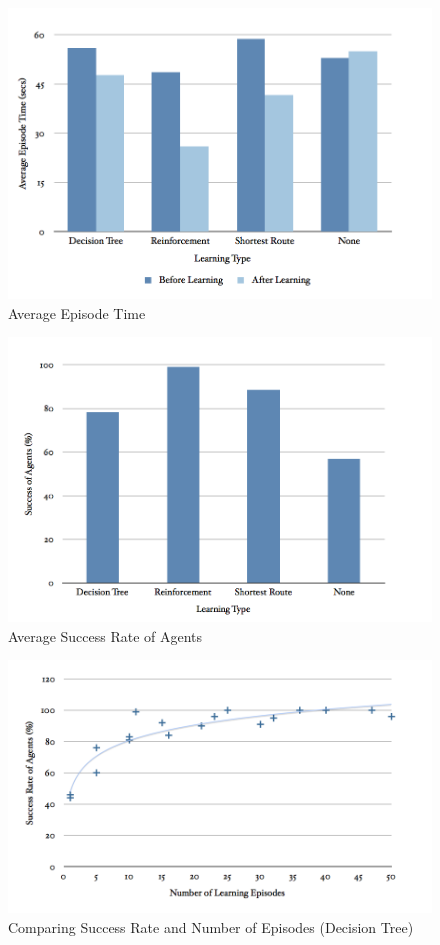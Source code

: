 \documentclass[a4paper,oneside]{report}
\begin{document}
\begin{figure}[H]
  \centering
    \includegraphics[width=130mm]{sources/images/AvgEpisode}
    \caption{Average Episode Time}
    \label{fig:AvgTime}
\end{figure}

\begin{figure}[H]
  \centering
    \includegraphics[width=130mm]{sources/images/AvgSuccess}
    \caption{Average Success Rate of Agents}
    \label{fig:AvgSuccess}
\end{figure}

\begin{figure}[H]
  \centering
    \includegraphics[width=130mm]{sources/images/SE_Tree}
    \caption{Comparing Success Rate and Number of Episodes (Decision Tree)}
    \label{fig:SE_Tree}
\end{figure}
\end{document}
